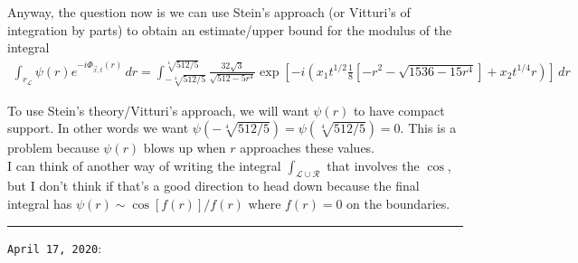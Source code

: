 \documentclass{article}
\theoremstyle{definition}
\newcommand{\lag}{\mathcal{L}}
\newcommand{\f}[2]{\frac{#1}{#2}}
\newcommand{\lp}{\left(}
\newcommand{\rp}{\right)}
\newcommand{\lb}{\left[}
\newcommand{\rb}{\right]}
\begin{document}
Anyway, the question now is we can use Stein's approach (or Vitturi's of integration by parts) to obtain an estimate/upper bound for the modulus of the integral 
\begin{align*}
\int_{r_\lag} \psi(r)e^{-i \Phi_{\vec{x},t}(r)}\,dr = \int_{-\sqrt[4]{512/5}}^{\sqrt[4]{512/5}} \f{32\sqrt{3}}{\sqrt{512 - 5r^4}} \exp \lb -i\lp x_1 t^{1/2}\f{1}{8}\lb -r^2 - \sqrt{1536 - 15r^4} \rb + x_2 t^{1/4} r \rp \rb\,dr
\end{align*}

To use Stein's theory/Vitturi's approach, we will want $\psi(r)$ to have compact support. In other words we want $\psi(-\sqrt[4]{512/5}) = \psi(\sqrt[4]{512/5}) = 0$. This is a problem because $\psi(r)$ blows up when $r$ approaches these values. \\



I can think of another way of writing the integral $\int_{\lag \cup \mathcal{R}}$ that involves the $\cos$, but I don't think if that's a good direction to head down because the final integral has $\psi(r) \sim \cos[f(r)]/f(r)$ where $f(r) = 0$ on the boundaries. \\





\hrule



\newpage

\texttt{April 17, 2020}:\\
$\,$\\
\end{document}
